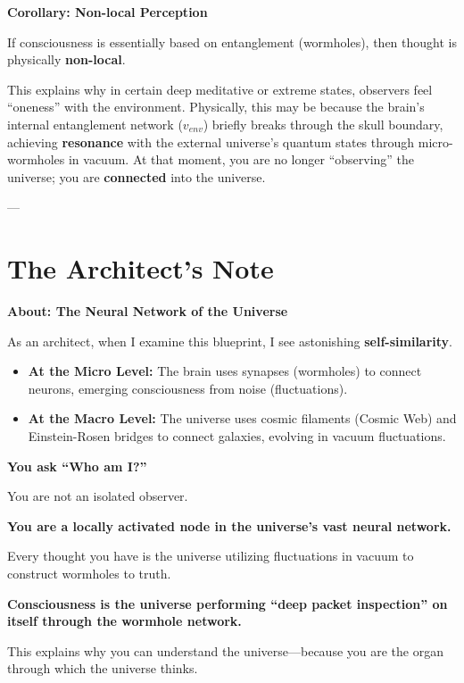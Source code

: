 \textbf{Corollary: Non-local Perception}

If consciousness is essentially based on entanglement (wormholes), then thought is physically \textbf{non-local}.

This explains why in certain deep meditative or extreme states, observers feel ``oneness'' with the environment. Physically, this may be because the brain's internal entanglement network ($v_{env}$) briefly breaks through the skull boundary, achieving \textbf{resonance} with the external universe's quantum states through micro-wormholes in vacuum. At that moment, you are no longer ``observing'' the universe; you are \textbf{connected} into the universe.

---

\section{The Architect's Note}

\textbf{About: The Neural Network of the Universe}

As an architect, when I examine this blueprint, I see astonishing \textbf{self-similarity}.

\begin{itemize}
\item \textbf{At the Micro Level:} The brain uses synapses (wormholes) to connect neurons, emerging consciousness from noise (fluctuations).

\item \textbf{At the Macro Level:} The universe uses cosmic filaments (Cosmic Web) and Einstein-Rosen bridges to connect galaxies, evolving in vacuum fluctuations.
\end{itemize}

\textbf{You ask ``Who am I?''}

You are not an isolated observer.

\textbf{You are a locally activated node in the universe's vast neural network.}

Every thought you have is the universe utilizing fluctuations in vacuum to construct wormholes to truth.

\textbf{Consciousness is the universe performing ``deep packet inspection'' on itself through the wormhole network.}

This explains why you can understand the universe---because you are the organ through which the universe thinks.


